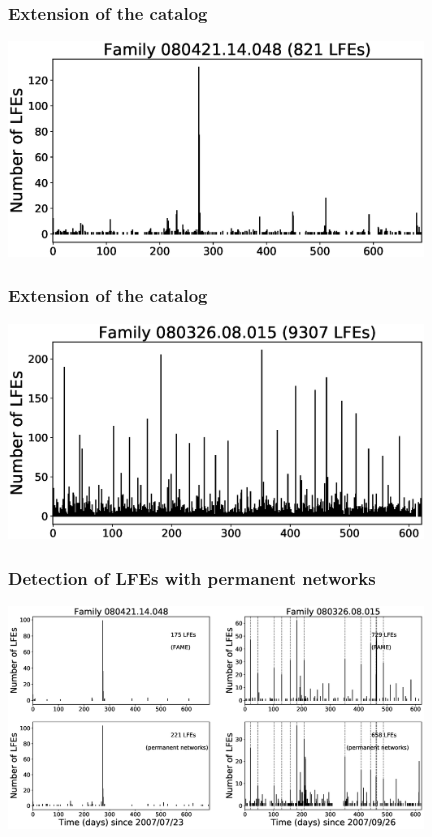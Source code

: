 \documentclass{beamer}
\begin{document}
	\begin{frame}
		\frametitle{Extension of the catalog}
		\begin{center}
			\includegraphics[width=11cm, trim={0cm 0cm 0cm 0cm}, clip]{catalog_SC/08042114048_FAME.eps}
		\end{center}
	\end{frame}
	
	\begin{frame}
		\frametitle{Extension of the catalog}
		\begin{center}
			\includegraphics[width=11cm, trim={0cm 0cm 0cm 0cm}, clip]{catalog_SC/08032608015_FAME.eps}
		\end{center}
	\end{frame}

	\begin{frame}
		\frametitle{Detection of LFEs with permanent networks}
		\begin{center}
			\includegraphics[width=11cm, trim={0cm 0cm 0cm 0cm}, clip]{other/Figure2.eps}
		\end{center}
	\end{frame}
\end{document}
